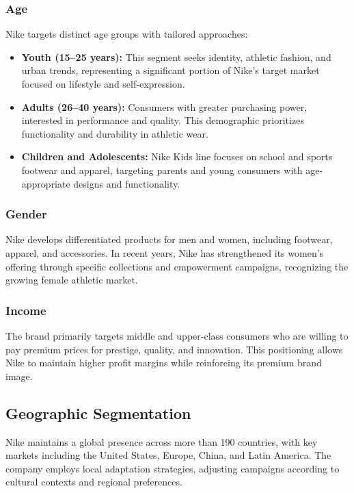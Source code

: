 \documentclass[letterpaper, 12pt]{article}
\begin{document}
\subsubsection{Age}
Nike targets distinct age groups with tailored approaches:
\begin{itemize}
    \item \textbf{Youth (15--25 years):} This segment seeks identity, athletic fashion, and urban trends, representing a significant portion of Nike's target market focused on lifestyle and self-expression.
    \item \textbf{Adults (26--40 years):} Consumers with greater purchasing power, interested in performance and quality. This demographic prioritizes functionality and durability in athletic wear.
    \item \textbf{Children and Adolescents:} Nike Kids line focuses on school and sports footwear and apparel, targeting parents and young consumers with age-appropriate designs and functionality.
\end{itemize}

\subsubsection{Gender}
Nike develops differentiated products for men and women, including footwear, apparel, and accessories. In recent years, Nike has strengthened its women's offering through specific collections and empowerment campaigns, recognizing the growing female athletic market.

\subsubsection{Income}
The brand primarily targets middle and upper-class consumers who are willing to pay premium prices for prestige, quality, and innovation. This positioning allows Nike to maintain higher profit margins while reinforcing its premium brand image.

\subsection{Geographic Segmentation}

Nike maintains a global presence across more than 190 countries, with key markets including the United States, Europe, China, and Latin America. The company employs local adaptation strategies, adjusting campaigns according to cultural contexts and regional preferences.
\end{document}

